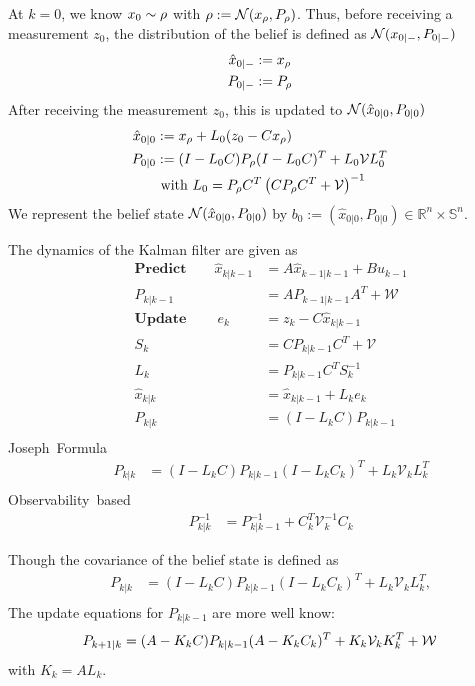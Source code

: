\documentclass{ifacconf}
\begin{document}
At $k=0$, we know $x_0\sim \rho$ with $\rho:=\mathcal N(x_\rho,P_\rho)$.
Thus,  before receiving a measurement $z_0$, the distribution of the belief is defined as $\mathcal{N}(x_{0|-}, P_{0|-})$
\begin{align}
	\hat x_{0|-}&:= x_\rho\\
	P_{0|-}&:= P_{\rho}
\end{align}
After receiving the measurement $z_0$, this is updated to $\mathcal{N}(\hat x_{0|0}, P_{0|0})$
\begin{align}
	\hat x_{0|0}&:= x_\rho+ L_0 (z_0-Cx_\rho)\\
	P_{0|0}&:=(I-L_0 C) P_{\rho}(I-L_0 C)^T+L_0\mathcal{V} L_0^T\\
	& \mbox{ with } L_0=P_{\rho}C^T\left(CP_{\rho}C^T+\mathcal V\right)^{-1}
\end{align}
We represent the belief state  $\mathcal{N}(\hat x_{0|0}, P_{0|0})$ by $b_0:=(\hat x_{0|0}, P_{0|0})\in\mathbb R^n\times \mathbb S^n$.

The dynamics of the Kalman filter are given as
	\begin{align*}
	&&\textbf{Predict} \qquad \hat x_{k|k-1}&=A\hat x_{k-1|k-1}+Bu_{k-1}\\
	&&P_{k|k-1}&=AP_{k-1|k-1}A^T+\mathcal W
\\
	&&\textbf{Update} \  \qquad e_{k}&=z_k-C \hat x_{k|k-1}\\
	&&S_k&=CP_{k|k-1}C^T+\mathcal V\\
	&&L_{k}&=P_{k|k-1}C^TS_k^{-1}\\
	&&\hat x_{k|k}&=\hat x_{k|k-1}+L_ke_k\\
	&&P_{k|k}&=(I-L_kC)P_{k|k-1}\\
	\end{align*}
	\mbox{Joseph Formula  }
	\begin{align*}
	&&P_{k|k}&=(I-L_kC)P_{k|k-1}(I-L_kC_k)^T+L_k\mathcal V_kL_k^T\\
		\end{align*}
\mbox{Observability based }
	\begin{align*}
	&& P_{k|k}^{-1}&=P_{k|k-1}^{-1}+C_k^T \mathcal  V_k^{-1}C_k
	\end{align*}

Though the covariance of the belief state is defined as 
	\begin{align*}
	&&P_{k|k}&=(I-L_kC)P_{k|k-1}(I-L_kC_k)^T+L_k\mathcal V_kL_k^T, \\
		\end{align*}
		The update equations for $P_{k|k-1}$ are more well know:
			\begin{align*}
	&&P_{k+1|k}&=(A-K_kC)P_{k|k-1}(A-K_kC_k)^T+K_k\mathcal V_kK_k^T +\mathcal{W}
		\end{align*}
		with $K_k=AL_k$.
		
\end{document}

